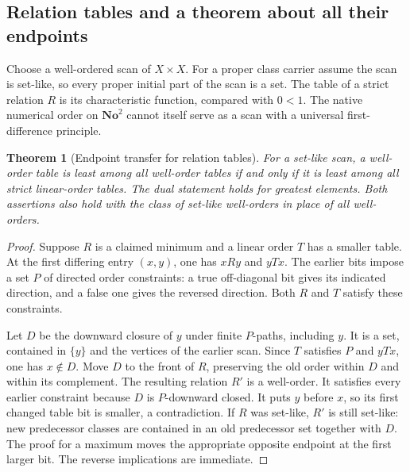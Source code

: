 \documentclass[11pt]{article}
\newtheorem{theorem}{Theorem}[section]
\theoremstyle{definition}
\theoremstyle{remark}
\newcommand{\No}{\mathbf{No}}
\begin{document}
\subsection{Relation tables and a theorem about all their endpoints}

Choose a well-ordered scan of $X\times X$. For a proper class carrier
assume the scan is set-like, so every proper initial part of the scan is
a set. The table of a strict relation $R$ is its characteristic function,
compared with $0<1$. The native numerical order on $\No^2$ cannot itself
serve as a scan with a universal first-difference principle.

\begin{theorem}[Endpoint transfer for relation tables]\label{swo:cb:thm:tableendpoints}
For a set-like scan, a well-order table is least among all well-order
tables if and only if it is least among all strict linear-order tables.
The dual statement holds for greatest elements. Both assertions also
hold with the class of set-like well-orders in place of all well-orders.
\end{theorem}
\begin{proof}
Suppose $R$ is a claimed minimum and a linear order $T$ has a smaller
table. At the first differing entry $(x,y)$, one has $xRy$ and $yTx$.
The earlier bits impose a set $P$ of directed order constraints: a true
off-diagonal bit gives its indicated direction, and a false one gives
the reversed direction. Both $R$ and $T$ satisfy these constraints.

Let $D$ be the downward closure of $y$ under finite $P$-paths, including
$y$. It is a set, contained in $\{y\}$ and the vertices of the earlier
scan. Since $T$ satisfies $P$ and $yTx$, one has $x\notin D$.
Move $D$ to the front of $R$, preserving the old order within $D$
and within its complement. The resulting relation $R'$ is a well-order.
It satisfies every earlier constraint because $D$ is $P$-downward
closed. It puts $y$ before $x$, so its first changed table bit is
smaller, a contradiction. If $R$ was set-like, $R'$ is still set-like:
new predecessor classes are contained in an old predecessor set together
with $D$. The proof for a maximum moves the appropriate opposite endpoint
at the first larger bit. The reverse implications are immediate.
\end{proof}
\end{document}
